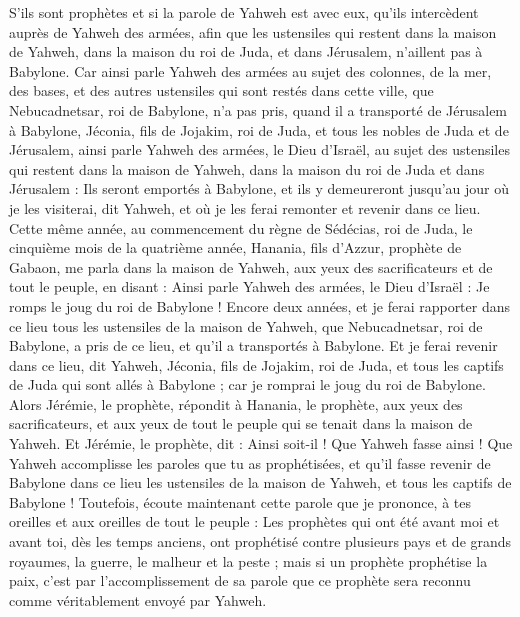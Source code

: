 \begin{multicols}{2}
S'ils sont prophètes et si la parole de Yahweh est avec eux, qu'ils intercèdent auprès de Yahweh des armées, afin que les ustensiles qui restent dans la maison de Yahweh, dans la maison du roi de Juda, et dans Jérusalem, n'aillent pas à Babylone.
Car ainsi parle Yahweh des armées au sujet des colonnes, de la mer, des bases, et des autres ustensiles qui sont restés dans cette ville,
que Nebucadnetsar, roi de Babylone, n'a pas pris, quand il a transporté de Jérusalem à Babylone, Jéconia, fils de Jojakim, roi de Juda, et tous les nobles de Juda et de Jérusalem,
ainsi parle Yahweh des armées, le Dieu d'Israël, au sujet des ustensiles qui restent dans la maison de Yahweh, dans la maison du roi de Juda et dans Jérusalem :
Ils seront emportés à Babylone, et ils y demeureront jusqu'au jour où je les visiterai, dit Yahweh, et où je les ferai remonter et revenir dans ce lieu.
\VerseOne{}Cette même année, au commencement du règne de Sédécias, roi de Juda, le cinquième mois de la quatrième année, Hanania, fils d'Azzur, prophète de Gabaon, me parla dans la maison de Yahweh, aux yeux des sacrificateurs et de tout le peuple, en disant :
Ainsi parle Yahweh des armées, le Dieu d'Israël : Je romps le joug du roi de Babylone !
Encore deux années, et je ferai rapporter dans ce lieu tous les ustensiles de la maison de Yahweh, que Nebucadnetsar, roi de Babylone, a pris de ce lieu, et qu'il a transportés à Babylone.
Et je ferai revenir dans ce lieu, dit Yahweh, Jéconia, fils de Jojakim, roi de Juda, et tous les captifs de Juda qui sont allés à Babylone ; car je romprai le joug du roi de Babylone.
Alors Jérémie, le prophète, répondit à Hanania, le prophète, aux yeux des sacrificateurs, et aux yeux de tout le peuple qui se tenait dans la maison de Yahweh.
Et Jérémie, le prophète, dit : Ainsi soit-il ! Que Yahweh fasse ainsi ! Que Yahweh accomplisse les paroles que tu as prophétisées, et qu'il fasse revenir de Babylone dans ce lieu les ustensiles de la maison de Yahweh, et tous les captifs de Babylone !
Toutefois, écoute maintenant cette parole que je prononce, à tes oreilles et aux oreilles de tout le peuple :
Les prophètes qui ont été avant moi et avant toi, dès les temps anciens, ont prophétisé contre plusieurs pays et de grands royaumes, la guerre, le malheur et la peste ;
mais si un prophète prophétise la paix, c'est par l'accomplissement de sa parole que ce prophète sera reconnu comme véritablement envoyé par Yahweh.

\end{multicols}
